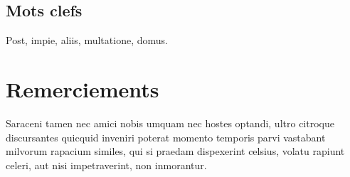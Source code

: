 \documentclass[oneside]{memoir}
\begin{document}
\section*{Mots clefs}
Post, impie, aliis, multatione, domus.

\pagebreak

\setcounter{page}{1}






	



\chapter*{Remerciements}
Saraceni tamen nec amici nobis umquam nec hostes optandi, ultro
citroque discursantes quicquid inveniri poterat momento temporis parvi
vastabant milvorum rapacium similes, qui si praedam dispexerint
celsius, volatu rapiunt celeri, aut nisi impetraverint, non
inmorantur.




\appendix

% 
\end{document}
